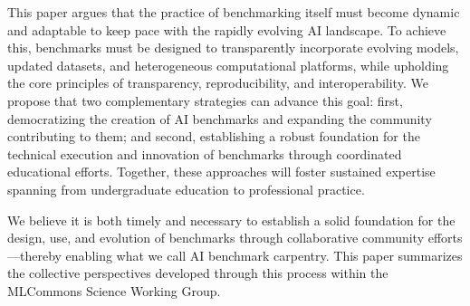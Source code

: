 This paper argues that the practice of benchmarking itself must become dynamic and adaptable to keep pace with the rapidly evolving AI landscape. To achieve this, benchmarks must be designed to transparently incorporate evolving models, updated datasets, and heterogeneous computational platforms, while upholding the core principles of transparency, reproducibility, and interoperability. We propose that two complementary strategies can advance this goal: first, democratizing the creation of AI benchmarks and expanding the community contributing to them; and second, establishing a robust foundation for the technical execution and innovation of benchmarks through coordinated educational efforts. Together, these approaches will foster sustained expertise spanning from undergraduate education to professional practice.

We believe it is both timely and necessary to establish a solid foundation for the design, use, and evolution of benchmarks through collaborative community efforts—thereby enabling what we call AI benchmark carpentry. This paper summarizes the collective perspectives developed through this process within the MLCommons Science Working Group.

